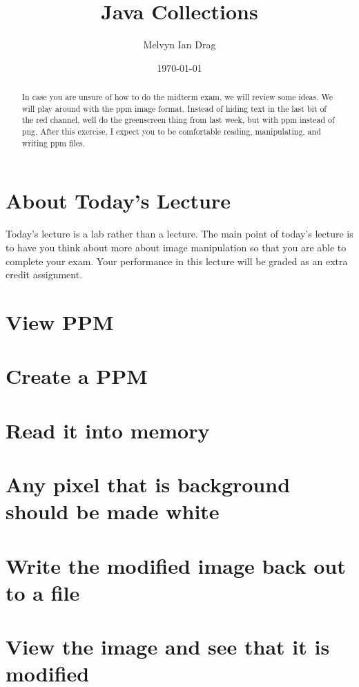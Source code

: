 \documentclass[12pt]{article}
\title{Java Collections}
\author{
	Melvyn Ian Drag
}
\date{\today}
\begin{document}
\maketitle

\begin{abstract}
In case you are unsure of how to do the midterm exam, we will review some ideas.
We will play around with the ppm image format. Instead of hiding text in the last bit of the red channel, well do the greenscreen thing from last week, but with ppm instead of png. After this exercise, I expect you to be comfortable reading, manipulating, and writing ppm files.
\end{abstract}


\section{About Today's Lecture}
Today's lecture is a lab rather than a lecture. The main point of today's lecture is to have you think about more about image manipulation so that you are able to complete your exam. Your performance in this lecture will be graded as an extra credit assignment.

\section{View PPM}

\section{Create a PPM}

\section{Read it into memory}

\section{Any pixel that is background should be made white}

\section{Write the modified image back out to a file}

\section{View the image and see that it is modified}
\end{document}
